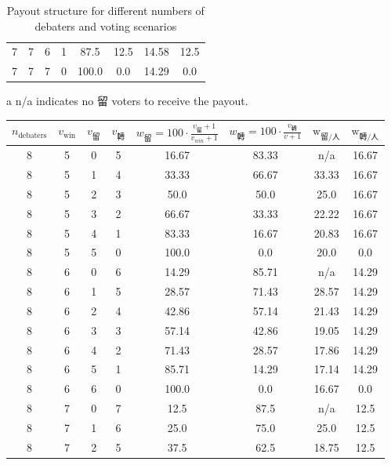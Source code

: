 \begin{enumerate}
\begin{table}[h]
\begin{threeparttable}
\begin{tabular}{cccccccc}
7 & 7 & 6 & 1 & 87.5 & 12.5 & 14.58 & 12.5 \\
7 & 7 & 7 & 0 & 100.0 & 0.0 & 14.29 & 0.0 \\
\bottomrule
\end{tabular}
\begin{tablenotes}
    \item[a] n/a indicates no 留 voters to receive the payout.
\end{tablenotes}
\caption{Payout structure for different numbers of debaters and voting scenarios}
\end{threeparttable}
\end{table}


\begin{table}[h]
    \centering
    \small
    \begin{threeparttable}
    \begin{tabular}{cccccccc}
    \toprule
    $n_{\text{debaters}}$ & $v_{\text{win}}$ & $v_{\text{留}}$ & $v_{\text{轉}}$ & $w_{\text{留}} = 100 \cdot \frac{v_{\text{留}}+1}{v_{win}+1} $ & $w_{\text{轉}} = 100\cdot\frac{v_{\text{轉}}}{v+1}$ & $\text{w}_{\text{留}/\text{人} }$ & $\text{w}_{\text{轉}/\text{人}}$ \\
    \midrule
8 & 5 & 0 & 5 & 16.67 & 83.33 & n/a\tnote{a} & 16.67 \\
8 & 5 & 1 & 4 & 33.33 & 66.67 & 33.33 & 16.67 \\
8 & 5 & 2 & 3 & 50.0 & 50.0 & 25.0 & 16.67 \\
8 & 5 & 3 & 2 & 66.67 & 33.33 & 22.22 & 16.67 \\
8 & 5 & 4 & 1 & 83.33 & 16.67 & 20.83 & 16.67 \\
8 & 5 & 5 & 0 & 100.0 & 0.0 & 20.0 & 0.0 \\
8 & 6 & 0 & 6 & 14.29 & 85.71 & n/a\tnote{a} & 14.29 \\
8 & 6 & 1 & 5 & 28.57 & 71.43 & 28.57 & 14.29 \\
8 & 6 & 2 & 4 & 42.86 & 57.14 & 21.43 & 14.29 \\
8 & 6 & 3 & 3 & 57.14 & 42.86 & 19.05 & 14.29 \\
8 & 6 & 4 & 2 & 71.43 & 28.57 & 17.86 & 14.29 \\
8 & 6 & 5 & 1 & 85.71 & 14.29 & 17.14 & 14.29 \\
8 & 6 & 6 & 0 & 100.0 & 0.0 & 16.67 & 0.0 \\
8 & 7 & 0 & 7 & 12.5 & 87.5 & n/a\tnote{a} & 12.5 \\
8 & 7 & 1 & 6 & 25.0 & 75.0 & 25.0 & 12.5 \\
8 & 7 & 2 & 5 & 37.5 & 62.5 & 18.75 & 12.5 \\

\end{tabular}
\end{threeparttable}
\end{table}
\end{enumerate}
